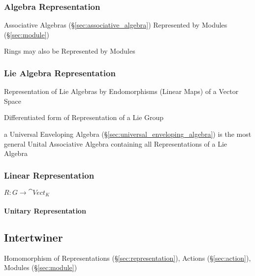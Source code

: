 \subsubsection{Algebra Representation}\label{sec:algebra_representation}

Associative Algebras (\S\ref{sec:associative_algebra}) Represented by Modules
(\S\ref{sec:module})

Rings may also be Represented by Modules



\subsubsection{Lie Algebra Representation}\label{sec:lie_algebra_representation}

Representation of Lie Algebras by Endomorphisms (Linear Maps) of a Vector Space

Differentiated form of Representation of a Lie Group

\fist a Universal Enveloping Algebra (\S\ref{sec:universal_enveloping_algebra})
is the most general Unital Associative Algebra containing all Representations
of a Lie Algebra



\subsubsection{Linear Representation}\label{sec:linear_representation}

$R : G \rightarrow \cat{Vect}_K$



\paragraph{Unitary Representation}\label{sec:unitary_representation}\hfill



\subsection{Intertwiner}\label{sec:intertwiner}

Homomorphism of Representations (\S\ref{sec:representation}), Actions
(\S\ref{sec:action}), Modules (\S\ref{sec:module})
